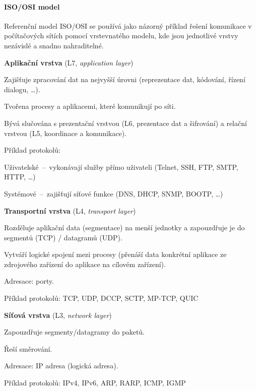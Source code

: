 \paragraph*{ISO/OSI model} Referenční model ISO/OSI se používá jako názorný příklad řešení komunikace v počítačových sítích pomocí vrstevnatého modelu, kde jsou jednotlivé vrstvy nezávislé a snadno nahraditelné. \begin{compactitem}

    \item \textbf{Aplikační vrstva} (L7, \textit{application layer}) \begin{compactitem}
        \item Zajišťuje zpracování dat na nejvyšší úrovni (reprezentace dat, kódování, řízení dialogu, \dots).
        \item Tvořena procesy a aplikacemi, které komunikují po síti.
        \item Bývá slučována s prezentační vrstvou (L6, prezentace dat a šifrování) a relační vrstvou (L5, koordinace a komunikace).
        \item Příklad protokolů: \begin{compactitem}
            \item Uživatelské~--~vykonávají služby přímo uživateli (Telnet, SSH, FTP, SMTP, HTTP, \dots)
            \item Systémové~--~zajišťují síťové funkce (DNS, DHCP, SNMP, BOOTP, \dots)
        \end{compactitem}
    \end{compactitem}

    \item \textbf{Transportní vrstva} (L4, \textit{transport layer}) \begin{compactitem}
        \item Rozděluje aplikační data (segmentace) na menší jednotky a zapouzdřuje je do segmentů (TCP) / datagramů (UDP).
        \item Vytváří logické spojení mezi procesy (přenáší data konkrétní aplikace ze zdrojového zařízení do aplikace na cílovém zařízení).
        \item Adresace: porty.
        \item Příklad protokolů: TCP, UDP, DCCP, SCTP, MP-TCP, QUIC
    \end{compactitem}

    \item \textbf{Síťová vrstva} (L3, \textit{network layer}) \begin{compactitem}
        \item Zapouzdřuje segmenty/datagramy do paketů.
        \item Řeší směrování.
        \item Adresace: IP adresa (logická adresa).
        \item Příklad protokolů: IPv4, IPv6, ARP, RARP, ICMP, IGMP
    \end{compactitem}


\end{compactitem}
